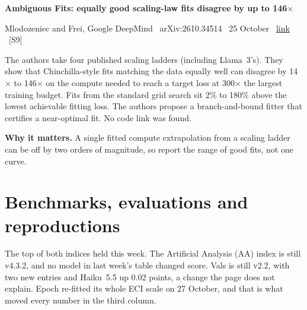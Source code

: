 \documentclass[11pt,a4paper]{article}
\newcommand{\entry}[4]{%
  \par\Needspace{7\baselineskip}\vspace{0.7em}%
  {\sffamily\bfseries\color{brandink}#1}\par
  {\footnotesize\color{brandgrey}#2 \textbullet\ \href{#3}{link} \textbullet\ \srcref{#4}}\par
  \vspace{0.15em}}
\newcommand{\why}[1]{\par{\small\textbf{Why it matters.} #1}\par}
\newcommand{\srcref}[1]{\textcolor{brandaccent}{[S#1]}}
\begin{document}
\entry{Ambiguous Fits: equally good scaling-law fits disagree by up to 146$\times$}{Mlodozeniec and Frei, Google DeepMind \textbullet\ arXiv:2610.34514 \textbullet\ 25 October}{https://arxiv.org/abs/2610.34514}{9}
The authors take four published scaling ladders (including Llama~3's). They show that Chinchilla-style fits matching the data equally well can disagree by 14$\times$ to 146$\times$ on the compute needed
to reach a target loss at 300$\times$ the largest training budget. Fits from the standard grid search sit 2\% to 180\% above the lowest achievable fitting loss. The authors propose a
branch-and-bound fitter that certifies a near-optimal fit. No code link was found.
\why{A single fitted compute extrapolation from a scaling ladder can be off by two orders of magnitude, so report the range of good fits, not one curve.}

\section{Benchmarks, evaluations and reproductions}

The top of both indices held this week. The Artificial Analysis (AA) index is still v4.3.2, and no model in last week's table changed score. Vals is still v2.2, with
two new entries and Haiku~5.5 up 0.02 points, a change the page does not explain. Epoch re-fitted its whole ECI scale on 27 October, and that is what moved every number in the
third column.
\end{document}
